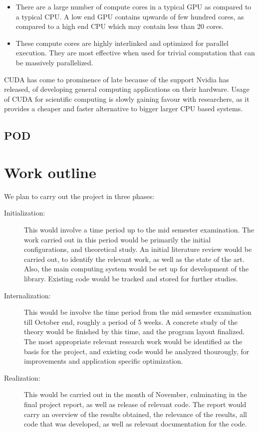 \documentclass[]{aiaa-tc_mod}%
\begin{document}
\begin{itemize}
\item 
	There are a large number of compute cores in a typical GPU as compared to 
	a typical CPU. A low end GPU contains upwards of few hundred cores, as 
	compared to a high end CPU which may contain less than 20 cores.
\item
	These compute cores are highly interlinked and optimized for parallel 
	execution. They are most effective when used for trivial computation 
	that can be massively parallelized.
\end{itemize}

CUDA has come to prominence of late because of the support Nvidia has released,
of developing general computing applications on their hardware. Usage of CUDA for 
scientific computing is slowly gaining favour with researchers, as it provides a 
cheaper and faster alternative to bigger larger CPU based systems.

\subsection{POD}

\section{Work outline}
We plan to carry out the project in three phases:
\begin{description}
\item[Initialization: ] This would involve a time period up to the mid semester 
	examination. The work carried out in this period would be primarily the
	initial configurations, and theoretical study. An initial literature 
	review would be carried out, to identify the relevant work, as well as 
	the state of the art. Also, the main computing system would be set up
	for development of the library. Existing code would be tracked and 
	stored for further studies.
\item[Internalization: ] This would be involve the time period from the mid 
	semester examination till October end, roughly a period of 5 weeks. 
	A concrete study of the theory would be finished by this time, and
	the program layout finalized. The most appropriate relevant research
	work would be identified as the basis for the project, and existing
	code would be analyzed thourougly, for improvements and application
	specific optimization.
\item[Realization: ] This would be carried out in the month of November, 
	culminating in the final project report, as well as release of 
	relevant code. The report would carry an overview of the results 
	obtained, the relevance of the results, all code that was developed, 
	as well as relevant documentation for the code. 
\end{description}
\begin{thebibliography}{9}%
\end{thebibliography}
\end{document}
